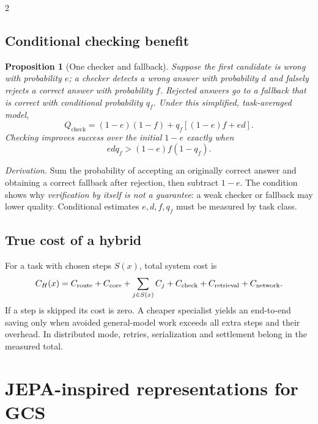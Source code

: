 \documentclass[10pt,letterpaper]{article}
\newtheorem{proposition}{Proposition}
\begin{document}
\begin{multicols}{2}
\subsection{Conditional checking benefit}
\begin{proposition}[One checker and fallback]
Suppose the first candidate is wrong with probability $e$; a checker detects a wrong answer with probability $d$ and falsely rejects a correct answer with probability $f$. Rejected answers go to a fallback that is correct with conditional probability $q_f$. Under this simplified, task-averaged model,
\begin{equation}
Q_{\mathrm{check}}=(1-e)(1-f)+q_f[(1-e)f+ed].
\end{equation}
Checking improves success over the initial $1-e$ exactly when
\begin{equation}
edq_f>(1-e)f(1-q_f).
\end{equation}
\end{proposition}
\noindent\emph{Derivation.} Sum the probability of accepting an originally correct answer and obtaining a correct fallback after rejection, then subtract $1-e$. The condition shows why \emph{verification by itself is not a guarantee}: a weak checker or fallback may lower quality. Conditional estimates $e,d,f,q_f$ must be measured by task class.

\subsection{True cost of a hybrid}
For a task with chosen steps $S(x)$, total system cost is
\begin{equation}
C_H(x)=C_{\rm route}+C_{\rm core}+\sum_{j\in S(x)}C_j+C_{\rm check}+C_{\rm retrieval}+C_{\rm network}.
\label{eq:cost}
\end{equation}
If a step is skipped its cost is zero. A cheaper specialist yields an end-to-end saving only when avoided general-model work exceeds all extra steps and their overhead. In distributed mode, retries, serialization and settlement belong in the measured total.

\section{JEPA-inspired representations for GCS}

\end{multicols}
\end{document}
